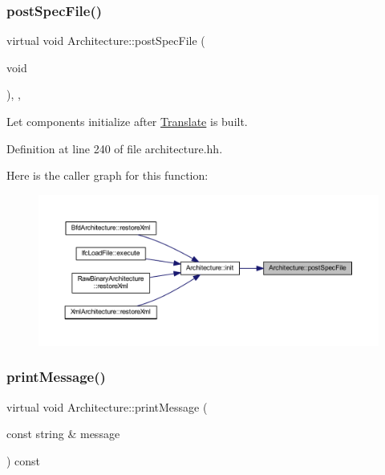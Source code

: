 \subsubsection{\texorpdfstring{postSpecFile()}{postSpecFile()}}
{\footnotesize\ttfamily virtual void Architecture\+::post\+Spec\+File (\begin{DoxyParamCaption}\item[{void}]{ }\end{DoxyParamCaption})\hspace{0.3cm}{\ttfamily [inline]}, {\ttfamily [protected]}, {\ttfamily [virtual]}}



Let components initialize after \mbox{\hyperlink{class_translate}{Translate}} is built. 



Definition at line 240 of file architecture.\+hh.

Here is the caller graph for this function\+:
\nopagebreak
\begin{figure}[H]
\begin{center}
\leavevmode
\includegraphics[width=350pt]{class_architecture_a7cee782dabf4362f10a0bbb4c950f85e_icgraph}
\end{center}
\end{figure}
\mbox{\label{class_architecture_a69348906c7601efa002f1f1365decda9}} 
\subsubsection{\texorpdfstring{printMessage()}{printMessage()}}
{\footnotesize\ttfamily virtual void Architecture\+::print\+Message (\begin{DoxyParamCaption}\item[{const string \&}]{message }\end{DoxyParamCaption}) const\hspace{0.3cm}{\ttfamily [pure virtual]}}



